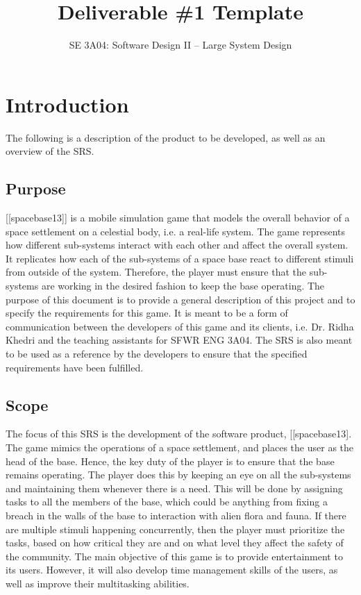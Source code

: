 \documentclass[]{article}
\title{Deliverable \#1 Template}
\author{SE 3A04: Software Design II -- Large System Design}
\date{}
\begin{document}
\maketitle	

\section{Introduction}
\label{sec:introduction}

The following is a description of the product to be developed, as well as an overview of the SRS.

\subsection{Purpose}
\label{sub:purpose}
	[[spacebase13]] is a mobile simulation game that models the overall behavior of a space settlement on a celestial body, i.e. a real-life system. The game represents how different sub-systems interact with each other and affect the overall system. It replicates how each of the sub-systems of a space base react to different stimuli from outside of the system. Therefore, the player must ensure that the sub-systems are working in the desired fashion to keep the base operating. The purpose of this document is to provide a general description of this project and to specify the requirements for this game. It is meant to be a form of communication between the developers of this game and its clients, i.e. Dr. Ridha Khedri and the teaching assistants for SFWR ENG 3A04. The SRS is also meant to be used as a reference by the developers to ensure that the specified requirements have been fulfilled.

\subsection{Scope}
\label{sub:scope}
	The focus of this SRS is the development of the software product, [[spacebase13]. The game mimics the operations of a space settlement, and places the user as the head of the base. Hence, the key duty of the player is to ensure that the base remains operating. The player does this by keeping an eye on all the sub-systems and maintaining them whenever there is a need. This will be done by assigning tasks to all the members of the base, which could be anything from fixing a breach in the walls of the base to interaction with alien flora and fauna. If there are multiple stimuli happening concurrently, then the player must prioritize the tasks, based on how critical they are and on what level they affect the safety of the community. The main objective of this game is to provide entertainment to its users. However, it will also develop time management skills of the users, as well as improve their multitasking abilities. 
\end{document}
